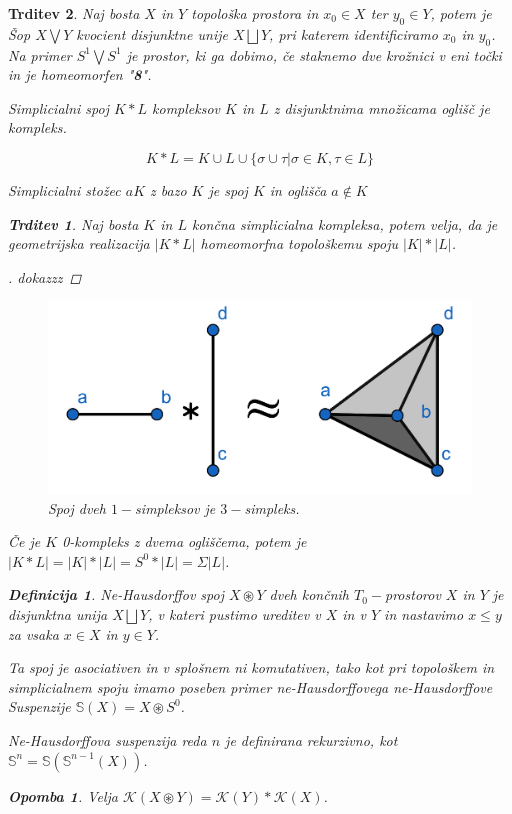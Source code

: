 \documentclass[a4paper,12pt]{article}
\DeclareRobustCommand{\k}{
    \mathcal{K}
}
\theoremstyle{definition}
\newtheorem{definicija}{Definicija}
\theoremstyle{plain}
\theoremstyle{definition}
\theoremstyle{plain}
\newtheorem{trditev}{Trditev}
\theoremstyle{plain}
\theoremstyle{plain}
\newtheorem{opomba}{Opomba}
\theoremstyle{plain}
\newenvironment{dokaz}{\begin{proof}[\bfseries\upshape\proofname]}{\end{proof}}
\begin{document}
\begin{trditev}
Naj bosta $X$ in $Y$ topološka prostora in $x_0\in X$ ter $y_0\in Y$, potem je 
\textit{Šop} $X\bigvee Y$ kvocient disjunktne unije $X\bigsqcup Y$, pri
 katerem identificiramo $x_0$ in $y_0$. Na primer $S^1\bigvee S^1$ je prostor,
  ki ga dobimo, če staknemo dve krožnici v eni točki in je homeomorfen "\textbf{8}".


\textit{Simplicialni spoj $K\ast L$} kompleksov $K$ in $L$ z disjunktnima množicama oglišč je kompleks.

$$
K\ast L=K\cup L \cup \{\sigma \cup \tau| \sigma \in K, \tau \in L \}
$$

\textit{Simplicialni stožec} $aK$ z bazo $K$ je spoj $K$ in oglišča $a\notin K$
\begin{trditev}
    \label{tr:spoj}
    Naj bosta $K$ in $L$ končna simplicialna kompleksa, potem velja, da je geometrijska realizacija $|K\ast L|$ homeomorfna topološkemu spoju $|K|\ast |L|$.
\end{trditev}
\begin{dokaz}
    dokazzz
\end{dokaz}

\begin{figure}[h]
    \centering
    \includegraphics[width=0.6\linewidth]{spoj.png}
    \caption{Spoj dveh $1-$simpleksov je $3-$simpleks.}
\end{figure}

Če je $K$ 0-kompleks z dvema ogliščema, potem je $|K\ast L|=|K|\ast |L|=S^0\ast |L| = \Sigma |L|$.

\begin{definicija}
    \textit{Ne-Hausdorffov spoj} $X\circledast Y$ dveh končnih $T_0-$prostorov
     $X$ in $Y$ je disjunktna unija $X\bigsqcup Y$, v kateri
     pustimo ureditev v $X$ in v $Y$ in nastavimo $x\leq y$ za vsaka 
     $x\in X$ in $y\in Y$.
\end{definicija}
Ta spoj je asociativen in v splošnem ni komutativen, tako kot pri topološkem
 in simplicialnem spoju imamo poseben primer ne-Hausdorffovega ne-Hausdorffove Suspenzije
  $\mathds{S}(X)=X \circledast S^0$.

  Ne-Hausdorffova suspenzija reda $n$ je definirana rekurzivno, kot  $\mathds{S}^n=\mathds{S}(\mathds{S}^{n-1}(X))$.
  \begin{opomba}
    \label{op:spoj}
    Velja $\k(X\circledast Y) = \k(Y)\ast \k(X)$.
  \end{opomba}

\end{trditev}
\end{document}
